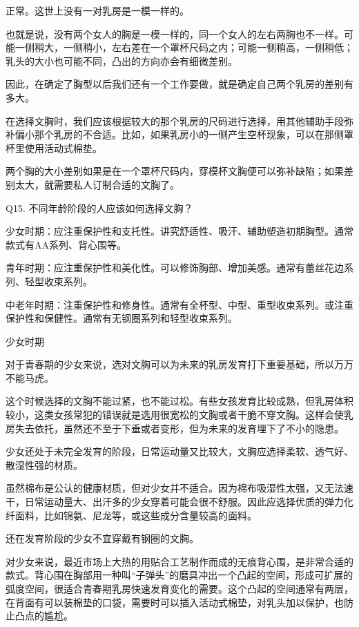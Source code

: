 \documentclass[12pt,UTF8]{ctexbook}
\begin{document}
正常。这世上没有一对乳房是一模一样的。

也就是说，没有两个女人的胸是一模一样的，同一个女人的左右两胸也不一样。可能一侧稍大，一侧稍小，左右差在一个罩杯尺码之内；可能一侧稍高，一侧稍低；乳头的大小也可能不同，凸出的方向亦会有细微差别。

因此，在确定了胸型以后我们还有一个工作要做，就是确定自己两个乳房的差别有多大。

在选择文胸时，我们应该根据较大的那个乳房的尺码进行选择，用其他辅助手段弥补偏小那个乳房的不合适。比如，如果乳房小的一侧产生空杯现象，可以在那侧罩杯里使用活动式棉垫。

两个胸的大小差别如果是在一个罩杯尺码内，穿模杯文胸便可以弥补缺陷；如果差别太大，就需要私人订制合适的文胸了。





Q15. 不同年龄阶段的人应该如何选择文胸？


少女时期：应注重保护性和支托性。讲究舒适性、吸汗、辅助塑造初期胸型。通常款式有AA系列、背心围等。

青年时期：应注重保护性和美化性。可以修饰胸部、增加美感。通常有蕾丝花边系列、轻型收束系列。

中老年时期：注重保护性和修身性。通常有全杯型、中型、重型收束系列。或注重保护性和保健性。通常有无钢圈系列和轻型收束系列。

少女时期

对于青春期的少女来说，选对文胸可以为未来的乳房发育打下重要基础，所以万万不能马虎。

这个时候选择的文胸不能过紧，也不能过松。有些女孩发育比较成熟，但乳房体积较小，这类女孩常犯的错误就是选用很宽松的文胸或者干脆不穿文胸。这样会使乳房失去依托，虽然还不至于下垂或者变形，但为未来的发育埋下了不小的隐患。

少女还处于未完全发育的阶段，日常运动量又比较大，文胸应选择柔软、透气好、散湿性强的材质。

虽然棉布是公认的健康材质，但对少女并不适合。因为棉布吸湿性太强，又无法速干，日常运动量大、出汗多的少女穿着可能会很不舒服。因此应选择优质的弹力化纤面料，比如锦氨、尼龙等，或这些成分含量较高的面料。

还在发育阶段的少女不宜穿戴有钢圈的文胸。


对少女来说，最近市场上大热的用贴合工艺制作而成的无痕背心围，是非常合适的款式。背心围在胸部用一种叫“子弹头”的磨具冲出一个凸起的空间，形成可扩展的弧度空间，很适合青春期乳房快速发育变化的需要。这个凸起的空间通常有两层，在背面有可以装棉垫的口袋，需要时可以插入活动式棉垫，对乳头加以保护，也防止凸点的尴尬。
\end{document}
